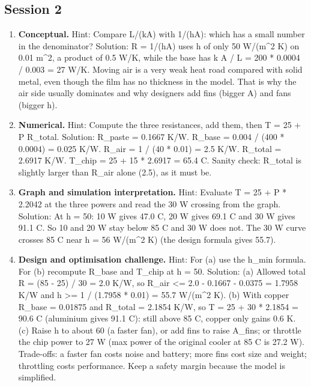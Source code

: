 \documentclass[11pt,a4paper]{article}
\begin{document}
\subsection*{Session 2}
\begin{enumerate}[nosep]
\item \textbf{Conceptual.} Hint: Compare L/(kA) with 1/(hA): which has a small number in the denominator? Solution: R = 1/(hA) uses h of only 50 W/(m\textasciicircum{}2 K) on 0.01 m\textasciicircum{}2, a product of 0.5 W/K, while the base has k A / L = 200 * 0.0004 / 0.003 = 27 W/K. Moving air is a very weak heat road compared with solid metal, even though the film has no thickness in the model. That is why the air side usually dominates and why designers add fins (bigger A) and fans (bigger h).
\item \textbf{Numerical.} Hint: Compute the three resistances, add them, then T = 25 + P R\_total. Solution: R\_paste = 0.1667 K/W. R\_base = 0.004 / (400 * 0.0004) = 0.025 K/W. R\_air = 1 / (40 * 0.01) = 2.5 K/W. R\_total = 2.6917 K/W. T\_chip = 25 + 15 * 2.6917 = 65.4 C. Sanity check: R\_total is slightly larger than R\_air alone (2.5), as it must be.
\item \textbf{Graph and simulation interpretation.} Hint: Evaluate T = 25 + P * 2.2042 at the three powers and read the 30 W crossing from the graph. Solution: At h = 50: 10 W gives 47.0 C, 20 W gives 69.1 C and 30 W gives 91.1 C. So 10 and 20 W stay below 85 C and 30 W does not. The 30 W curve crosses 85 C near h = 56 W/(m\textasciicircum{}2 K) (the design formula gives 55.7).
\item \textbf{Design and optimisation challenge.} Hint: For (a) use the h\_min formula. For (b) recompute R\_base and T\_chip at h = 50. Solution: (a) Allowed total R = (85 - 25) / 30 = 2.0 K/W, so R\_air \textless{}= 2.0 - 0.1667 - 0.0375 = 1.7958 K/W and h \textgreater{}= 1 / (1.7958 * 0.01) = 55.7 W/(m\textasciicircum{}2 K). (b) With copper R\_base = 0.01875 and R\_total = 2.1854 K/W, so T = 25 + 30 * 2.1854 = 90.6 C (aluminium gives 91.1 C): still above 85 C, copper only gains 0.6 K. (c) Raise h to about 60 (a faster fan), or add fins to raise A\_fins; or throttle the chip power to 27 W (max power of the original cooler at 85 C is 27.2 W). Trade-offs: a faster fan costs noise and battery; more fins cost size and weight; throttling costs performance. Keep a safety margin because the model is simplified.
\end{enumerate}
\end{document}
